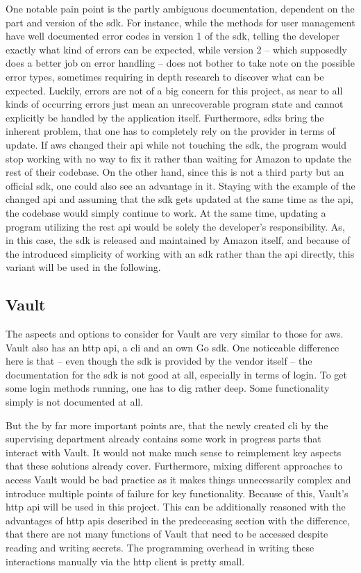 One notable pain point is the partly ambiguous documentation, dependent on the part and version of the \ac{sdk}.
For instance, while the methods for user management have well documented error codes in version 1 of the \ac{sdk}, telling the developer exactly what kind of errors can be expected, while version 2 -- which supposedly does a better job on error handling -- does not bother to take note on the possible error types, sometimes requiring in depth research to discover what can be expected.
Luckily, errors are not of a big concern for this project, as near to all kinds of occurring errors just mean an unrecoverable program state and cannot explicitly be handled by the application itself.
Furthermore, \acp{sdk} bring the inherent problem, that one has to completely rely on the provider in terms of update.
If \ac{aws} changed their \ac{api} while not touching the \ac{sdk}, the program would stop working with no way to fix it rather than waiting for Amazon to update the rest of their codebase.
On the other hand, since this is not a third party but an official \ac{sdk}, one could also see an advantage in it.
Staying with the example of the changed \ac{api} and assuming that the \ac{sdk} gets updated at the same time as the \ac{api}, the codebase would simply continue to work.
At the same time, updating a program utilizing the \acs{rest} \ac{api} would be solely the developer's responsibility.
As, in this case, the \ac{sdk} is released and maintained by Amazon itself, and because of the introduced simplicity of working with an \ac{sdk} rather than the \ac{api} directly, this variant will be used in the following.

\subsection{Vault}
The aspects and options to consider for Vault are very similar to those for \ac{aws}.
Vault also has an \ac{http} \ac{api}, a \ac{cli} and an own Go \ac{sdk}.
One noticeable difference here is that -- even though the \ac{sdk} is provided by the vendor itself -- the documentation for the \ac{sdk} is not good at all, especially in terms of login.
To get some login methods running, one has to dig rather deep.
Some functionality simply is not documented at all.


But the by far more important points are, that the newly created \ac{cli} by the supervising department already contains some work in progress parts that interact with Vault.
It would not make much sense to reimplement key aspects that these solutions already cover.
Furthermore, mixing different approaches to access Vault would be bad practice as it makes things unnecessarily complex and introduce multiple points of failure for key functionality.
Because of this, Vault's \ac{http} \ac{api} will be used in this project.
This can be additionally reasoned with the advantages of \ac{http} \acp{api} described in the predeceasing section with the difference, that there are not many functions of Vault that need to be accessed despite reading and writing secrets.
The programming overhead in writing these interactions manually via the \ac{http} client is pretty small.

